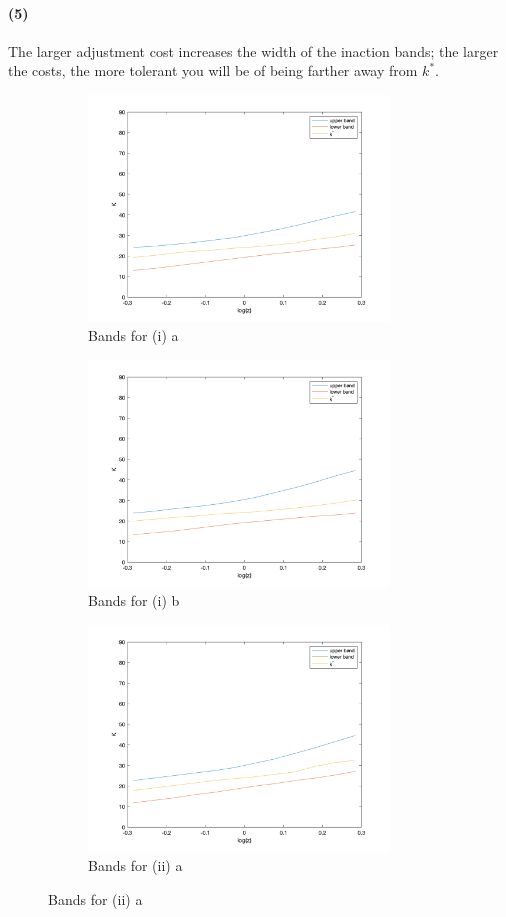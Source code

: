 \documentclass[10pt,letter]{article}
\newcommand{\problempart}[1]{\paragraph{#1}}
\begin{document}
\problempart{(5)} The larger adjustment cost increases the width of the inaction bands; the larger the costs, the more tolerant you will be of being farther away from $k^*$.
\begin{center}
\begin{figure}
\begin{subfigure}{.5\textwidth}
\includegraphics[width=8cm]{ps3q2_fig9}
\caption{Bands for (i) a}
\end{subfigure}
\begin{subfigure}{.5\textwidth}
\includegraphics[width=8cm]{ps3q2_fig10}
\caption{Bands for (i) b}
\end{subfigure}
\begin{subfigure}{.5\textwidth}
\includegraphics[width=8cm]{ps3q2_fig11}
\caption{Bands for (ii) a}
\end{subfigure}

\end{figure}
\end{center}
\end{document}
